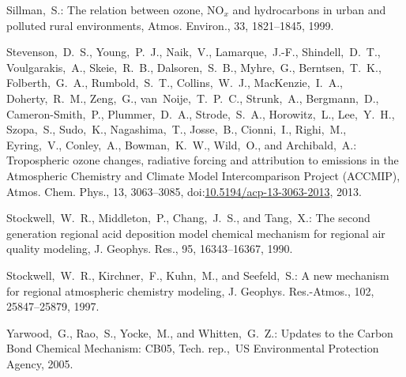 \documentclass[acpd, online, hvmath]{copernicus}
\begin{document}
\begin{thebibliography}{34}
 Sillman,~S.: {The relation
    between ozone, NO$_{x}$ and hydrocarbons in urban and polluted
    rural environments}, Atmos. Environ., 33, 1821--1845,
  1999.


 Stevenson,~D.~S.,
  Young,~P.~J., Naik,~V., Lamarque,~J.-F., Shindell,~D.~T.,
  Voulgarakis,~A., Skeie,~R.~B., Dalsoren,~S.~B., Myhre,~G.,
  Berntsen,~T.~K., Folberth,~G.~A., Rumbold,~S.~T., Collins,~W.~J.,
  MacKenzie,~I.~A., Doherty,~R.~M., Zeng,~G., van~Noije,~T.~P.~C.,
  Strunk,~A., Bergmann,~D., Cameron-Smith,~P., Plummer,~D.~A.,
  Strode,~S.~A., Horowitz,~L., Lee,~Y.~H., Szopa,~S., Sudo,~K.,
  Nagashima,~T., Josse,~B., Cionni,~I., Righi,~M., Eyring,~V.,
  Conley,~A., Bowman,~K.~W., Wild,~O., and Archibald,~A.: Tropospheric
  ozone changes, radiative forcing and attribution to emissions in the
  Atmospheric Chemistry and Climate Model Intercomparison Project
  (ACCMIP), Atmos. Chem. Phys., 13, 3063--3085,
  doi:\href{http://dx.doi.org/10.5194/acp-13-3063-2013}{10.5194/acp-13-3063-2013}, 2013.



 Stockwell,~W.~R., Middleton,~P.,
  Chang,~J.~S., and Tang,~X.: {The second generation regional acid
    deposition model chemical mechanism for regional air quality
    modeling}, J. Geophys. Res., 95, 16343--16367, 1990.


 Stockwell,~W.~R., Kirchner,~F.,
  Kuhn,~M., and Seefeld,~S.: {A new mechanism for regional atmospheric
    chemistry modeling}, J. Geophys. Res.-Atmos., 102, 25847--25879,
  1997.


Yarwood,~G., Rao,~S., Yocke,~M., and Whitten,~G.~Z.: {Updates to the Carbon Bond Chemical Mechanism: CB05}, Tech. rep.,~US Environmental Protection Agency, 2005. 

\end{thebibliography}
\end{document}
